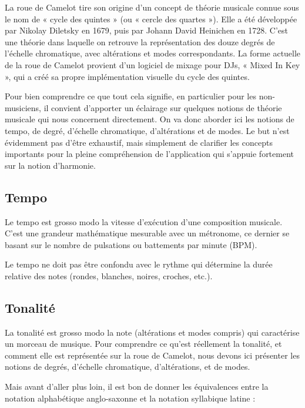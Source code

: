 \documentclass[a4paper,12pt]{article}
\begin{document}
\newpage

La roue de Camelot tire son origine d'un concept de théorie musicale connue sous le nom de « cycle des quintes » (ou « cercle des quartes »). Elle a été développée par Nikolay Diletsky en 1679, puis par Johann David Heinichen en 1728. C'est une théorie dans laquelle on retrouve la représentation des douze degrés de l'échelle chromatique, avec altérations et modes correspondants. La forme actuelle de la roue de Camelot provient d'un logiciel de mixage pour DJs, « Mixed In Key », qui a créé sa propre implémentation visuelle du cycle des quintes.

Pour bien comprendre ce que tout cela signifie, en particulier pour les non-musiciens, il convient d'apporter un éclairage sur quelques notions de théorie musicale qui nous concernent directement. On va donc aborder ici les notions de tempo, de degré, d'échelle chromatique, d'altérations et de modes. Le but n'est évidemment pas d'être exhaustif, mais simplement de clarifier les concepts importants pour la pleine compréhension de l'application qui s'appuie fortement sur la notion d'harmonie.

\subsection{Tempo}

Le tempo est grosso modo la vitesse d'exécution d'une composition musicale. C'est une grandeur mathématique mesurable avec un métronome, ce dernier se basant sur le nombre de pulsations ou battements par minute (BPM).

Le tempo ne doit pas être confondu avec le rythme qui détermine la durée relative des notes (rondes, blanches, noires, croches, etc.).

\subsection{Tonalité}

La tonalité est grosso modo la note (altérations et modes compris) qui caractérise un morceau de musique. Pour comprendre ce qu'est réellement la tonalité, et comment elle est représentée sur la roue de Camelot, nous devons ici présenter les notions de degrés, d'échelle chromatique, d'altérations, et de modes.

Mais avant d'aller plus loin, il est bon de donner les équivalences entre la notation alphabétique anglo-saxonne et la notation syllabique latine :
\end{document}
